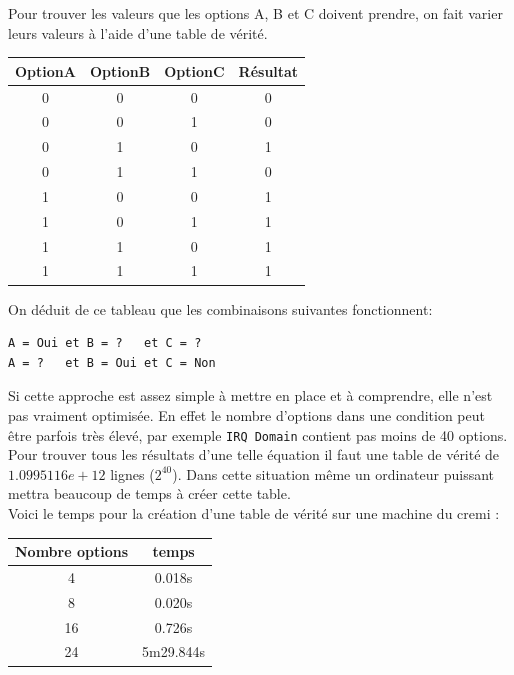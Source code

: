 \documentclass[17pts]{report}
\begin{document}
Pour trouver les valeurs que les options A, B et C doivent prendre, on fait
varier leurs valeurs à l'aide d'une table de vérité.  \\
\newline
\begin{tabular}{|c|c|c||c|}
    \hline
    OptionA & OptionB & OptionC & Résultat\\
    \hline
    \hline
    0 & 0 & 0 & 0\\
    \hline
    0 & 0 & 1 & 0\\
    \hline
    0 & 1 & 0 & 1\\
    \hline
    0 & 1 & 1 & 0\\
    \hline
    1 & 0 & 0 & 1\\
    \hline
    1 & 0 & 1 & 1\\
    \hline
    1 & 1 & 0 & 1\\
    \hline
    1 & 1 & 1 & 1\\
    \hline
\end{tabular}
\newline
\newline

On déduit de ce tableau que les combinaisons suivantes fonctionnent:
\begin{verbatim}
A = Oui et B = ?   et C = ?
A = ?   et B = Oui et C = Non
\end{verbatim}

Si cette approche est assez simple à mettre en place et à comprendre, elle
n'est pas vraiment optimisée. En effet le nombre d'options dans une condition
peut être parfois très élevé, par exemple \verb|IRQ Domain| contient pas
moins de 40 options.\\
Pour trouver tous les résultats d'une telle équation il faut une table
de vérité de $1.0995116e+12$ lignes ($2^{40}$). Dans cette situation même
un ordinateur puissant mettra beaucoup de temps à créer cette table.
\\
Voici le temps pour la création d'une table de vérité sur une machine du cremi :
\\

\begin{tabular}{|c|c|}
    \hline
    Nombre options & temps\\
    \hline
    \hline
    4 & 0.018s\\
    \hline
    8 & 0.020s\\
    \hline
    16 & 0.726s\\
    \hline
    24 & 5m29.844s\\
    \hline
\end{tabular}
\newline
\newline
\end{document}
